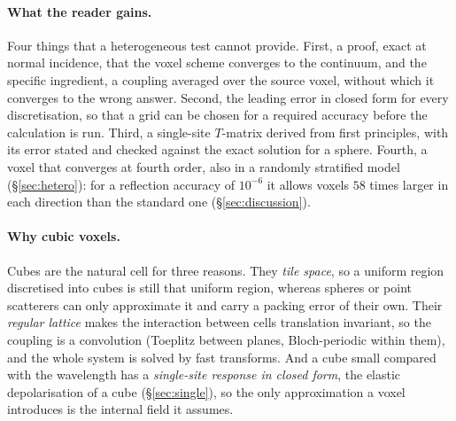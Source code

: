 \documentclass[extra,mreferee]{gji}
\begin{document}
\paragraph{What the reader gains.} Four things that a heterogeneous test cannot provide. First, a
proof, exact at normal incidence, that the voxel scheme converges to the continuum, and the specific ingredient, a coupling
averaged over the source voxel, without which it converges to the wrong answer. Second, the
leading error in closed form for every discretisation, so that a grid can be chosen for a required
accuracy before the calculation is run. Third, a single-site $T$-matrix derived from first
principles, with its error stated and checked against the exact solution for a sphere. Fourth, a
voxel that converges at fourth order, also in a randomly stratified model (\S\ref{sec:hetero}): for a reflection accuracy of $10^{-6}$ it allows voxels $58$
times larger in each direction than the standard one (\S\ref{sec:discussion}).

\paragraph{Why cubic voxels.} Cubes are the natural cell for three reasons. They \emph{tile space},
so a uniform region discretised into cubes is still that uniform region, whereas spheres or point
scatterers can only approximate it and carry a packing error of their own. Their \emph{regular
lattice} makes the interaction between cells translation invariant, so the coupling is a
convolution (Toeplitz between planes, Bloch-periodic within them), and the whole system is solved
by fast transforms. And a cube small compared with the wavelength has a \emph{single-site response
in closed form}, the elastic depolarisation of a cube (\S\ref{sec:single}), so the only
approximation a voxel introduces is the internal field it assumes.
\end{document}
